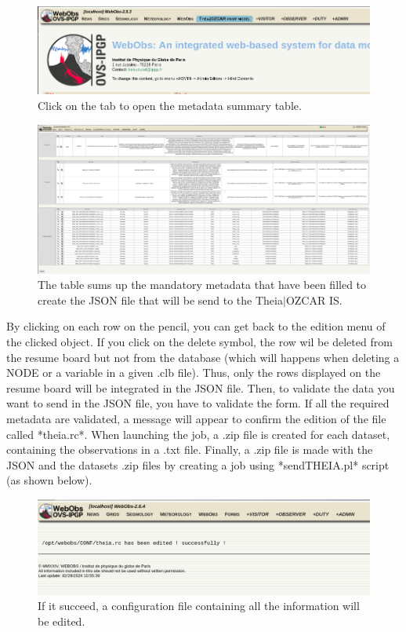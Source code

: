 \begin{figure}[!h]
	\centering
	\includegraphics[width=\textwidth]{figures/theia_tab.png}
	\caption{Click on the tab to open the metadata summary table.}
\end{figure}

\begin{figure}[!h]
	\centering
	\includegraphics[width=\textwidth]{figures/theia_recap_table.png}
	\caption{The table sums up the mandatory metadata that have been filled to create the JSON file that will be send to the Theia$\vert$OZCAR IS.}
\end{figure}

By clicking on each row on the pencil, you can get back to the edition menu of the clicked object. If you click on the delete symbol, the row wil be deleted from the resume board but not from the database (which will happens when deleting a NODE or a variable in a given .clb file). Thus, only the rows displayed on the resume board will be integrated in the JSON file. Then, to validate the data you want to send in the JSON file, you have to validate the form. If all the required metadata are  validated, a message will appear to confirm the edition of the file called *theia.rc*. When launching the job, a .zip file is created for each dataset, containing the observations in a .txt file. Finally, a .zip file is made with the JSON and the datasets .zip files by creating a job using *sendTHEIA.pl* script (as shown below).

\newpage

\begin{figure}[!h]
	\centering
	\includegraphics[scale=0.25]{figures/theia_rc.png}
	\caption{If it succeed, a configuration file containing all the information will be edited.}
\end{figure}

